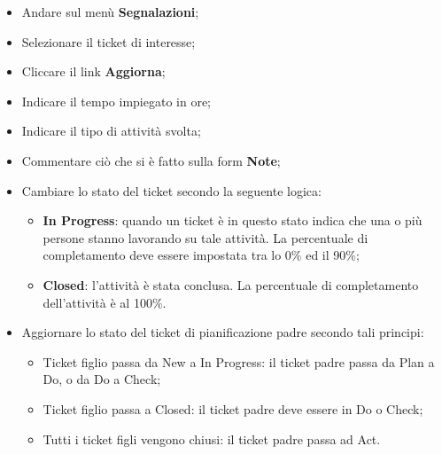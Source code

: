 \begin{itemize}
\item Andare sul menù \textbf{Segnalazioni}; 
\item Selezionare il ticket di interesse; 
\item Cliccare il link \textbf{Aggiorna}; 
\item Indicare il tempo impiegato in ore; 
\item Indicare il tipo di attività svolta; 
\item Commentare ciò che si è fatto sulla form \textbf{Note}; 
\item Cambiare lo stato del ticket secondo la seguente logica: 
		\begin{itemize}
		\item \textbf{In Progress}: quando un ticket è in questo stato indica che una o più persone 
		stanno lavorando su tale attività. La percentuale di completamento deve 
		essere impostata tra lo 0\% ed il 90\%; 
		\item \textbf{Closed}: l’attività è stata conclusa. La percentuale di completamento dell’attività è al 100\%. 
		 
		\end{itemize} 
\item Aggiornare lo stato del ticket di pianificazione padre secondo tali principi: 
		\begin{itemize}
		\item Ticket figlio passa da New a In Progress: il ticket padre passa da Plan a Do, 
		o da Do a Check; 
		\item Ticket figlio passa a Closed: il ticket padre deve essere in Do o Check; 
		\item Tutti i ticket figli vengono chiusi: il ticket padre passa ad Act.
		\end{itemize}

\end{itemize}




